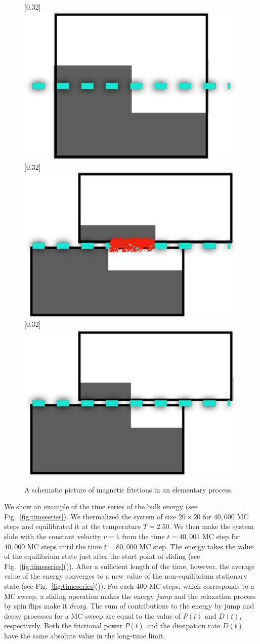 \begin{figure}[htbp]
	\centering
	\subcaptionbox{\label{subcap:snapshot1}}[0.32\linewidth]{\includegraphics[width=0.25\linewidth]{Snapshot1.pdf}}
	\subcaptionbox{\label{subcap:snapshot2}}[0.32\linewidth]{\includegraphics[width=0.25\linewidth]{Snapshot2.pdf}}
	\subcaptionbox{\label{subcap:snapshot3}}[0.32\linewidth]{\includegraphics[width=0.25\linewidth]{Snapshot3.pdf}}
	
	\caption{A schematic picture of magnetic frictions in an elementary process.}
	\label{fig:snapshots}
\end{figure}

We show an example of the time series of the bulk energy (see Fig.~\ref{fig:timeseries}). We thermalized the system of size $20\times 20$ for $40{,}000$ MC steps and equilibrated it at the temperature $T=2.50$. We then make the system slide with the constant velocity $v=1$ from the time $t=40{,}001$ MC step for $40{,}000$ MC steps until the time $t=80{,}000$ MC step. The energy takes the value of the equilibrium state just after the start point of sliding (see Fig.~\ref{fig:timeseries}()). After a sufficient length of the time, however, the average value of the energy converges to a new value of the non-equilibrium stationary state (see Fig.~\ref{fig:timeseries}()). For each $400$ MC steps, which corresponds to a MC sweep, a sliding operation makes the energy \textit{jump} and the relaxation process by spin flips make it \textit{decay}. The sum of contributions to the energy by jump and decay processes for a MC sweep are equal to the value of $P(t)$ and $D(t)$, respectively. Both the frictional power $P(t)$ and the dissipation rate $D(t)$ have the same absolute value in the long-time limit.

